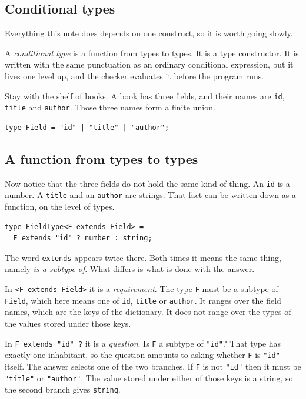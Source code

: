\documentclass[11pt,a4paper]{article}
\begin{document}
\newpage

\begin{pinkbox}
\section{Conditional types}
\label{sec:cond}

Everything this note does depends on one construct, so it is worth going slowly.

A \emph{conditional type} is a function from types to types. It is a type constructor. It is
written with the same punctuation as an ordinary conditional expression, but it lives one level
up, and the checker evaluates it before the program runs.

Stay with the shelf of books. A book has three fields, and their names are \texttt{id},
\texttt{title} and \texttt{author}. Those three names form a finite union.

\begin{lstlisting}[language=TS]
type Field = "id" | "title" | "author";
\end{lstlisting}

\subsection{A function from types to types}

Now notice that the three fields do not hold the same kind of thing. An \texttt{id} is a number.
A \texttt{title} and an \texttt{author} are strings. That fact can be written down as a function,
on the level of types.

\begin{lstlisting}[language=TS]
type FieldType<F extends Field> =
  F extends "id" ? number : string;
\end{lstlisting}

The word \texttt{extends} appears twice there. Both times it means the same thing, namely
\emph{is a subtype of}. What differs is what is done with the answer.

In \texttt{<F extends Field>} it is a \emph{requirement}. The type \texttt{F} must be a subtype of
\texttt{Field}, which here means one of \texttt{id}, \texttt{title} or \texttt{author}. It ranges
over the field names, which are the keys of the dictionary. It does not range over the types of the
values stored under those keys.

In \texttt{F extends "id" ?} it is a \emph{question}. Is \texttt{F} a subtype of \texttt{"id"}?
That type has exactly one inhabitant, so the question amounts to asking whether \texttt{F} is
\texttt{"id"} itself. The answer selects one of the two branches. If \texttt{F} is not
\texttt{"id"} then it must be \texttt{"title"} or \texttt{"author"}. The value stored under either
of those keys is a string, so the second branch gives \texttt{string}.


\end{pinkbox}
\end{document}
